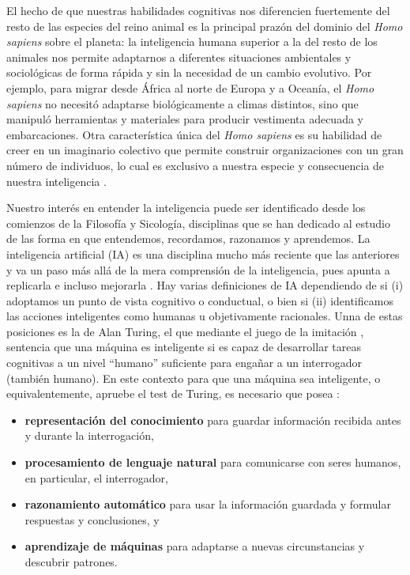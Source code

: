 El hecho de que nuestras habilidades cognitivas nos diferencien fuertemente del resto de las especies del reino animal es la principal prazón del dominio del \emph{Homo sapiens} sobre el planeta: la inteligencia humana superior a la del resto de los animales nos permite adaptarnos a diferentes situaciones ambientales y sociológicas de forma rápida y sin la necesidad de un cambio evolutivo. Por ejemplo, para migrar desde África al norte de Europa y a Oceanía, el \emph{Homo sapiens} no necesitó adaptarse biológicamente a climas distintos, sino que manipuló herramientas y materiales para producir vestimenta adecuada y embarcaciones. Otra característica única del \emph{Homo sapiens} es su habilidad de creer en un imaginario colectivo que permite construir organizaciones con un gran número de individuos, lo cual es exclusivo a nuestra especie y consecuencia de nuestra inteligencia \cite{harari}. 

Nuestro interés en entender la inteligencia puede ser identificado desde los comienzos de la Filosofía y Sicología, disciplinas que se han dedicado al estudio de las forma en que entendemos, recordamos, razonamos y aprendemos. La inteligencia artificial (IA) es una disciplina mucho más reciente que las anteriores y va un paso más allá de la mera comprensión de la inteligencia, pues apunta a replicarla e incluso mejorarla \cite{bostrom_2014}. Hay varias definiciones de IA dependiendo de si (i) adoptamos un punto de vista cognitivo o conductual, o bien si (ii) identificamos las acciones inteligentes como humanas u objetivamente racionales. Unna de estas posiciones es la de Alan Turing, el que mediante el juego de la imitación \cite{turing_1950}, sentencia que una máquina es inteligente si es capaz de desarrollar tareas cognitivas a un nivel “humano” suficiente para engañar a un interrogador (también humano). En este contexto para que una máquina sea inteligente, o equivalentemente, apruebe el test de Turing, es necesario que posea \cite{russell_norvig_2009}:  
\begin{itemize}
	\item \textbf{representación del conocimiento} para guardar información recibida antes y durante la interrogación,
	\item \textbf{procesamiento de lenguaje natural} para comunicarse con seres humanos, en particular, el interrogador,
	\item \textbf{razonamiento automático} para usar la información guardada y formular respuestas y conclusiones, y
	\item \textbf{aprendizaje de máquinas} para adaptarse a nuevas circunstancias y descubrir patrones.
\end{itemize}

